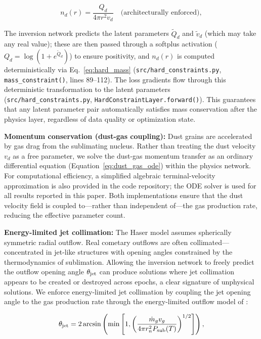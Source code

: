 \documentclass[usenatbib]{mnras}
\begin{document}
\begin{equation}\label{eq:hard_mass}
n_d(r) = \frac{Q_d}{4\pi r^2 v_d} \quad \text{(architecturally enforced)},
\end{equation}

The inversion network predicts the latent parameters $\tilde{Q}_d$ and $\tilde{v}_d$ (which may take any real value); these are then passed through a softplus activation ($Q_d = \log(1 + e^{\tilde{Q}_d})$) to ensure positivity, and $n_d(r)$ is computed deterministically via Eq.~\ref{eq:hard_mass} (\texttt{src/hard\_constraints.py}, \texttt{mass\_constraint()}, lines 89--112). The loss gradients flow through this deterministic transformation to the latent parameters (\texttt{src/hard\_constraints.py}, \texttt{HardConstraintLayer.forward()}). This guarantees that any latent parameter pair automatically satisfies mass conservation after the physics layer, regardless of data quality or optimization state.

\textbf{Momentum conservation (dust-gas coupling):} Dust grains are accelerated by gas drag from the sublimating nucleus. Rather than treating the dust velocity $v_d$ as a free parameter, we solve the dust-gas momentum transfer as an ordinary differential equation (Equation~\ref{eq:dust_gas_ode}) within the physics network. For computational efficiency, a simplified algebraic terminal-velocity approximation is also provided in the code repository; the ODE solver is used for all results reported in this paper. Both implementations ensure that the dust velocity field is coupled to---rather than independent of---the gas production rate, reducing the effective parameter count.

\textbf{Energy-limited jet collimation:} The Haser model assumes spherically symmetric radial outflow. Real cometary outflows are often collimated---concentrated in jet-like structures with opening angles constrained by the thermodynamics of sublimation. Allowing the inversion network to freely predict the outflow opening angle $\theta_{\rm jet}$ can produce solutions where jet collimation appears to be created or destroyed across epochs, a clear signature of unphysical solutions. We enforce energy-limited jet collimation by coupling the jet opening angle to the gas production rate through the energy-limited outflow model of \citet{belton07}:

\begin{equation}\label{eq:hard_angular}
\theta_{\rm jet} = 2 \arcsin\left(\min\left[1, \left(\frac{\dot{m}_g v_g}{4 \pi r_n^2 P_{\rm sub}(T)}\right)^{1/2}\right]\right),
\end{equation}
\end{document}
